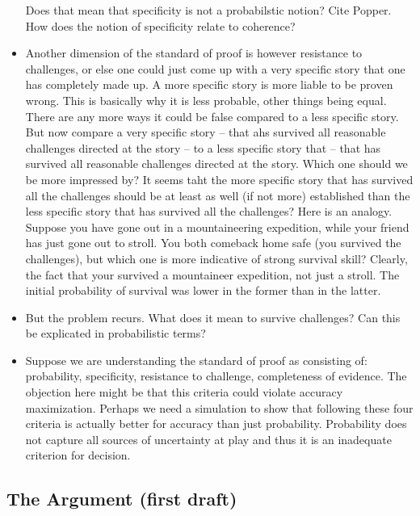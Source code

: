 \documentclass[
  10pt,
  dvipsnames,enabledeprecatedfontcommands]{scrartcl}
\begin{document}
\begin{itemize}
  Does that mean that specificity is not a probabilstic notion? Cite
  Popper. How does the notion of specificity relate to coherence?
\item
  Another dimension of the standard of proof is however resistance to
  challenges, or else one could just come up with a very specific story
  that one has completely made up. A more specific story is more liable
  to be proven wrong. This is basically why it is less probable, other
  things being equal. There are any more ways it could be false compared
  to a less specific story. But now compare a very specific story --
  that ahs survived all reasonable challenges directed at the story --
  to a less specific story that -- that has survived all reasonable
  challenges directed at the story. Which one should we be more
  impressed by? It seems taht the more specific story that has survived
  all the challenges should be at least as well (if not more)
  established than the less specific story that has survived all the
  challenges? Here is an analogy. Suppose you have gone out in a
  mountaineering expedition, while your friend has just gone out to
  stroll. You both comeback home safe (you survived the challenges), but
  which one is more indicative of strong survival skill? Clearly, the
  fact that your survived a mountaineer expedition, not just a stroll.
  The initial probability of survival was lower in the former than in
  the latter.
\item
  But the problem recurs. What does it mean to survive challenges? Can
  this be explicated in probabilistic terms?
\item
  Suppose we are understanding the standard of proof as consisting of:
  probability, specificity, resistance to challenge, completeness of
  evidence. The objection here might be that this criteria could violate
  accuracy maximization. Perhaps we need a simulation to show that
  following these four criteria is actually better for accuracy than
  just probability. Probability does not capture all sources of
  uncertainty at play and thus it is an inadequate criterion for
  decision.
\end{itemize}

\hypertarget{the-argument-first-draft}{%
\subsection{The Argument (first draft)}\label{the-argument-first-draft}}

\noindent\makebox[\linewidth]{\rule{\paperwidth}{1pt}}
\end{document}
